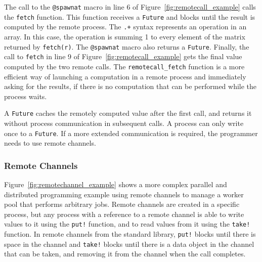 The call to the \texttt{@spawnat} macro in line 6 of
Figure~\ref{fig:remotecall_example} calls the \texttt{fetch} function. This
function receives a \texttt{Future} and blocks until the result is computed by
the remote process. The \texttt{.+} syntax represents an operation in an array.
In this case, the operation is summing 1 to every element of the matrix
returned by \texttt{fetch(r)}. The \texttt{@spawnat} macro also returns a
\texttt{Future}.  Finally, the call to \texttt{fetch} in line 9 of
Figure~\ref{fig:remotecall_example} gets the final value computed by the two
remote calls. The \texttt{remotecall\_fetch} function is a more efficient way
of launching a computation in a remote process and immediately asking for the
results, if there is no computation that can be performed while the process
waits.

A \texttt{Future} caches the remotely computed value after the first call,
and returns it without process communication in subsequent calls. A process
can only write once to a \texttt{Future}. If a more extended communication
is required, the programmer needs to use remote channels.

\subsubsection{Remote Channels}

Figure~\ref{fig:remotechannel_example} shows a more complex parallel and
distributed programming example using remote channels to manage a worker pool
that performs arbitrary jobs. Remote channels are created in a specific
process, but any process with a reference to a remote channel is able to write
values to it using the \texttt{put!} function, and to read values from it using
the \texttt{take!} function. In remote channels from the standard library,
\texttt{put!} blocks until there is space in the channel and \texttt{take!}
blocks until there is a data object in the channel that can be taken, and
removing it from the channel when the call completes.

